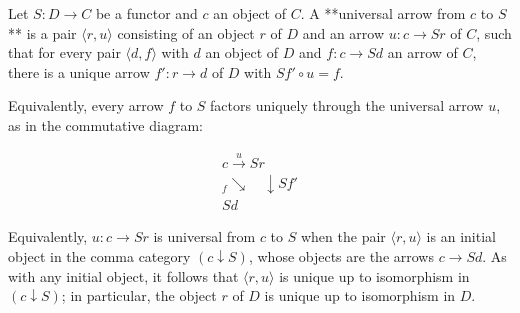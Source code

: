 Let $S: D \to C$ be a functor and $c$ an object of $C$. A **universal arrow from $c$ to $S$** is a pair $\langle r, u \rangle$ consisting of an object $r$ of $D$ and an arrow $u: c \to Sr$ of $C$, such that for every pair $\langle d, f \rangle$ with $d$ an object of $D$ and $f: c \to Sd$ an arrow of $C$, there is a unique arrow $f': r \to d$ of $D$ with $Sf' \circ u = f$.

Equivalently, every arrow $f$ to $S$ factors uniquely through the universal arrow $u$, as in the commutative diagram:

\[
\begin{array}{c}
c \xrightarrow{u} Sr \\
{}_{f} \searrow \quad \downarrow Sf' \\
Sd
\end{array}
\]

Equivalently, $u: c \to Sr$ is universal from $c$ to $S$ when the pair $\langle r, u \rangle$ is an initial object in the comma category $(c \downarrow S)$, whose objects are the arrows $c \to Sd$. As with any initial object, it follows that $\langle r, u \rangle$ is unique up to isomorphism in $(c \downarrow S)$; in particular, the object $r$ of $D$ is unique up to isomorphism in $D$.
